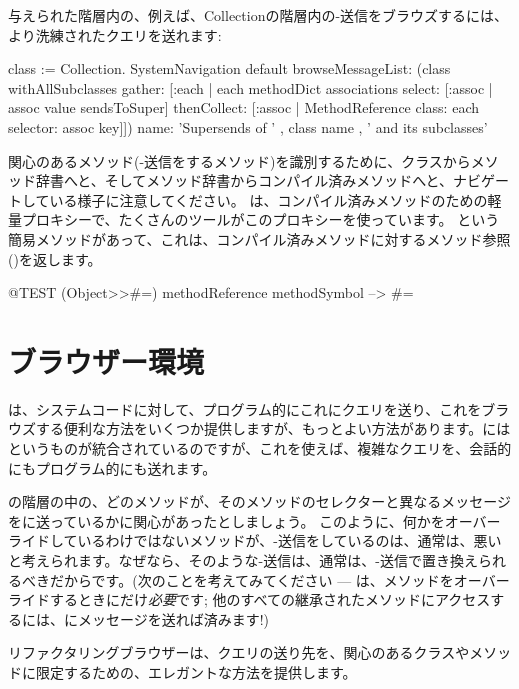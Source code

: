 \documentclass[a4paper,10pt,twoside]{book}
\begin{document}

与えられた階層内の、例えば、Collectionの階層内の\super-送信をブラウズするには、より洗練されたクエリを送れます:
\begin{code}{}
class := Collection.
SystemNavigation default
  browseMessageList: (class withAllSubclasses gather: [:each |
    each methodDict associations
      select: [:assoc | assoc value sendsToSuper]
      thenCollect: [:assoc | MethodReference class: each selector: assoc key]])
  name: 'Supersends of ' , class name , ' and its subclasses'
\end{code}
関心のあるメソッド(\super-送信をするメソッド)を識別するために、クラスからメソッド辞書へと、そしてメソッド辞書からコンパイル済みメソッドへと、ナビゲートしている様子に注意してください。
は、コンパイル済みメソッドのための軽量プロキシーで、たくさんのツールがこのプロキシーを使っています。
という簡易メソッドがあって、これは、コンパイル済みメソッドに対するメソッド参照()を返します。
\begin{code}{@TEST}
(Object>>#=) methodReference methodSymbol --> #=
\end{code}

\section{ブラウザー環境}

は、システムコードに対して、プログラム的にこれにクエリを送り、これをブラウズする便利な方法をいくつか提供しますが、もっとよい方法があります。\pharo にはというものが統合されているのですが、これを使えば、複雑なクエリを、会話的にもプログラム的にも送れます。

の階層の中の、どのメソッドが、そのメソッドのセレクターと異なるメッセージを\super に送っているかに関心があったとしましょう。
このように、何かをオーバーライドしているわけではないメソッドが、\super-送信をしているのは、通常は、悪いと考えられます。なぜなら、そのような\super-送信は、通常は、\self-送信で置き換えられるべきだからです。(次のことを考えてみてください --- \super は、メソッドをオーバーライドするときにだけ\emph{必要}です; 他のすべての継承されたメソッドにアクセスするには、\self にメッセージを送れば済みます!)

リファクタリングブラウザーは、クエリの送り先を、関心のあるクラスやメソッドに限定するための、エレガントな方法を提供します。
\end{document}
